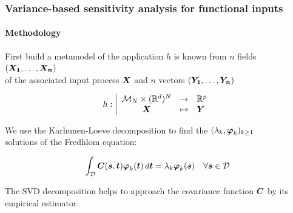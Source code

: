 \documentclass[aspectratio=169]{beamer}
\date[]{UserDay \#15, 10 June 2022, EDF Lab Saclay}
\begin{document}

\begin{frame}
\frametitle{Variance-based sensitivity analysis for functional inputs}

\framesubtitle{Methodology}

First build a metamodel of the application $h$ is known from $n$ fields $(\mat{X_1}, \dots, \mat{X_n})$ \\
of the associated input process $\mat{X}$ and $n$ vectors $(\vect{Y_1},\dots,\vect{Y_n})$

$$
h: \left|
  \begin{array}{ccl}
      \cM_N \times (\Rset^d)^N & \rightarrow & \Rset^p \\
      \mat{X} & \mapsto & \vect{Y}
  \end{array}
\right.
$$

\vspace{10mm}

We use the Karhunen-Loeve decomposition to find the $(\lambda_k, \vect{\varphi}_k)_{k \geq 1}$ \\
solutions of the Fredhlom equation:

$$
\int_{\cD} \mat{C}(\vect{s},\vect{t}) \vect{\varphi}_k(\vect{t})\,  d\vect{t} = \lambda_k  \vect{\varphi}_k(\vect{s}) \quad \forall \vect{s} \in \cD
$$

The SVD decomposition helps to approach the covariance function $\mat{C}$ by its empirical estimator.

\end{frame}
\end{document}
